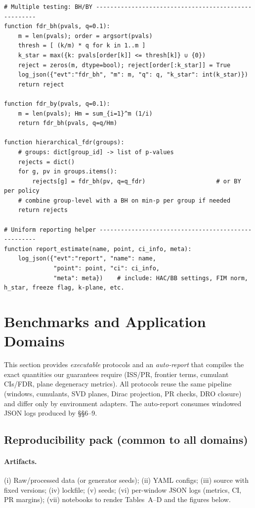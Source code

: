 \documentclass[10pt]{article}
\begin{document}
\begin{lstlisting}
# Multiple testing: BH/BY -----------------------------------------------------
function fdr_bh(pvals, q=0.1):
    m = len(pvals); order = argsort(pvals)
    thresh = [ (k/m) * q for k in 1..m ]
    k_star = max({k: pvals[order[k]] <= thresh[k]} ∪ {0})
    reject = zeros(m, dtype=bool); reject[order[:k_star]] = True
    log_json({"evt":"fdr_bh", "m": m, "q": q, "k_star": int(k_star)})
    return reject

function fdr_by(pvals, q=0.1):
    m = len(pvals); Hm = sum_{i=1}^m (1/i)
    return fdr_bh(pvals, q=q/Hm)

function hierarchical_fdr(groups):
    # groups: dict[group_id] -> list of p-values
    rejects = dict()
    for g, pv in groups.items():
        rejects[g] = fdr_bh(pv, q=q_fdr)                    # or BY per policy
    # combine group-level with a BH on min-p per group if needed
    return rejects

# Uniform reporting helper ----------------------------------------------------
function report_estimate(name, point, ci_info, meta):
    log_json({"evt":"report", "name": name,
              "point": point, "ci": ci_info,
              "meta": meta})    # include: HAC/BB settings, FIM norm, h_star, freeze flag, k-plane, etc.

\end{lstlisting}


\section{Benchmarks and Application Domains}\label{sec:bench}

This section provides \emph{executable} protocols and an \emph{auto-report} that compiles the exact quantities our guarantees require (ISS/PR, frontier terms, cumulant CIs/FDR, plane degeneracy metrics). All protocols reuse the same pipeline (windows, cumulants, SVD planes, Dirac projection, PR checks, DRO closure) and differ only by environment adapters. The auto-report consumes windowed JSON logs produced by §§6–9.

\subsection{Reproducibility pack (common to all domains)}\label{subsec:bench-repro}

\paragraph{Artifacts.} (i) Raw/processed data (or generator seeds); (ii) YAML configs; (iii) source with fixed versions; (iv) lockfile; (v) seeds; (vi) per-window JSON logs (metrics, CI, PR margins); (vii) notebooks to render Tables~A–D and the figures below.
\end{document}
